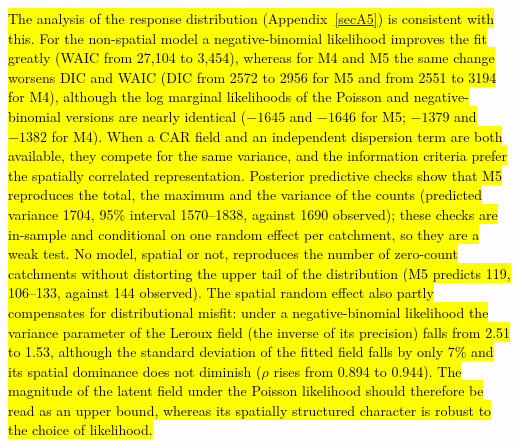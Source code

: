 \documentclass[journal abbreviation, manuscript]{copernicus}
\newcommand{\hlE}[1]{{\sethlcolor{edcyan}\hl{#1}}}
\begin{document}
\hlE{The analysis of the response distribution (\mbox{Appendix~\ref{secA5}}) is consistent with this. For the non-spatial model a negative-binomial likelihood improves the fit greatly (WAIC from 27,104 to 3,454), whereas for M4 and M5 the same change worsens DIC and WAIC (DIC from 2572 to 2956 for M5 and from 2551 to 3194 for M4), although the log marginal likelihoods of the Poisson and negative-binomial versions are nearly identical ($-1645$ and $-1646$ for M5; $-1379$ and $-1382$ for M4). When a CAR field and an independent dispersion term are both available, they compete for the same variance, and the information criteria prefer the spatially correlated representation. Posterior predictive checks show that M5 reproduces the total, the maximum and the variance of the counts (predicted variance 1704, 95\% interval 1570--1838, against 1690 observed); these checks are in-sample and conditional on one random effect per catchment, so they are a weak test. No model, spatial or not, reproduces the number of zero-count catchments without distorting the upper tail of the distribution (M5 predicts 119, 106--133, against 144 observed). The spatial random effect also partly compensates for distributional misfit: under a negative-binomial likelihood the variance parameter of the Leroux field (the inverse of its precision) falls from 2.51 to 1.53, although the standard deviation of the fitted field falls by only 7\% and its spatial dominance does not diminish ($\rho$ rises from 0.894 to 0.944). The magnitude of the latent field under the Poisson likelihood should therefore be read as an upper bound, whereas its spatially structured character is robust to the choice of likelihood.}
\end{document}
